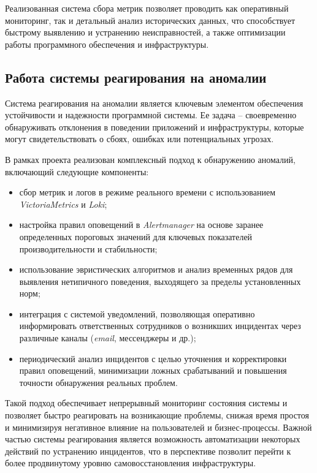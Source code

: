 Реализованная система сбора метрик позволяет проводить как оперативный мониторинг, так и детальный анализ исторических данных, что способствует быстрому выявлению и устранению неисправностей, а также оптимизации работы программного обеспечения и инфраструктуры.


\subsection{Работа системы реагирования на аномалии}

Система реагирования на аномалии является ключевым элементом обеспечения устойчивости и надежности программной системы. Ее задача -- своевременно обнаруживать отклонения в поведении приложений и инфраструктуры, которые могут свидетельствовать о сбоях, ошибках или потенциальных угрозах.

В рамках проекта реализован комплексный подход к обнаружению аномалий, включающий следующие компоненты:

\begin{itemize}
    \item сбор метрик и логов в режиме реального времени с использованием \textit{VictoriaMetrics} и \textit{Loki};
    \item настройка правил оповещений в \textit{Alertmanager} на основе заранее определенных пороговых значений для ключевых показателей производительности и стабильности;
    \item использование эвристических алгоритмов и анализ временных рядов для выявления нетипичного поведения, выходящего за пределы установленных норм;
    \item интеграция с системой уведомлений, позволяющая оперативно информировать ответственных сотрудников о возникших инцидентах через различные каналы (\textit{email}, мессенджеры и др.);
    \item периодический анализ инцидентов с целью уточнения и корректировки правил оповещений, минимизации ложных срабатываний и повышения точности обнаружения реальных проблем.
\end{itemize}

Такой подход обеспечивает непрерывный мониторинг состояния системы и позволяет быстро реагировать на возникающие проблемы, снижая время простоя и минимизируя негативное влияние на пользователей и бизнес-процессы. Важной частью системы реагирования является возможность автоматизации некоторых действий по устранению инцидентов, что в перспективе позволит перейти к более продвинутому уровню самовосстановления инфраструктуры.

